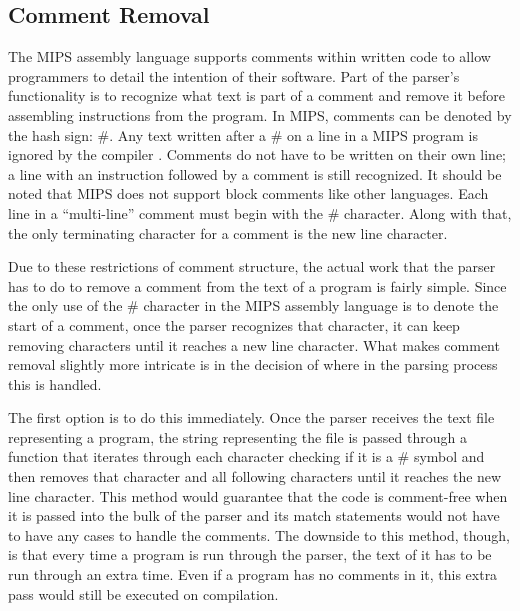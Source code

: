 \documentclass[
    paper=letter,
    parskip=half,
    fontsize=12pt,
    titlepage=firstiscover,
    toc=bibliography,
    numbers=endperiod
]{scrartcl}
\begin{document}
\subsection{Comment Removal}

The MIPS assembly language supports comments within written code to
allow programmers to detail the intention of their software. Part of the
parser's functionality is to recognize what text is part of a comment
and remove it before assembling instructions from the program. In MIPS,
comments can be denoted by the hash sign: \#. Any text written after a
\# on a line in a MIPS program is ignored by the compiler
\cite{wikibooks-mips-instructions}. Comments do not have to be written
on their own line; a line with an instruction followed by a comment is
still recognized. It should be noted that MIPS does not support block
comments like other languages. Each line in a ``multi-line'' comment
must begin with the \# character. Along with that, the only terminating
character for a comment is the new line character.

Due to these restrictions of comment structure, the actual work that the
parser has to do to remove a comment from the text of a program is
fairly simple. Since the only use of the \# character in the MIPS
assembly language is to denote the start of a comment, once the parser
recognizes that character, it can keep removing characters until it
reaches a new line character. What makes comment removal slightly more
intricate is in the decision of where in the parsing process this is
handled.

The first option is to do this immediately. Once the parser receives the
text file representing a program, the string representing the file is
passed through a function that iterates through each character checking
if it is a \# symbol and then removes that character and all following
characters until it reaches the new line character. This method would
guarantee that the code is comment-free when it is passed into the bulk
of the parser and its match statements would not have to have any cases
to handle the comments. The downside to this method, though, is that
every time a program is run through the parser, the text of it has to be
run through an extra time. Even if a program has no comments in it, this
extra pass would still be executed on compilation.
\end{document}
